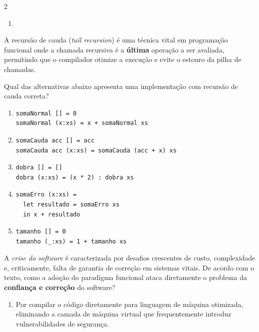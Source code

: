 \documentclass[a4paper,10pt,brazil]{article}
\begin{document}
\begin{multicols}{2}
\begin{enumerate}
  \item {}


\end{enumerate}

A recursão de cauda (\emph{tail recursion}) é uma técnica vital em programação funcional onde a chamada recursiva é a \textbf{última} operação a ser avaliada, permitindo que o compilador otimize a execução e evite o estouro da pilha de chamadas. 

Qual das alternativas abaixo apresenta uma implementação com recursão de cauda correta?

\begin{enumerate}
  \item \begin{verbatim}
somaNormal [] = 0
somaNormal (x:xs) = x + somaNormal xs
\end{verbatim}

  \item \begin{verbatim}
somaCauda acc [] = acc
somaCauda acc (x:xs) = somaCauda (acc + x) xs
\end{verbatim}

  \item \begin{verbatim}
dobra [] = []
dobra (x:xs) = (x * 2) : dobra xs
\end{verbatim}

  \item \begin{verbatim}
somaErro (x:xs) = 
  let resultado = somaErro xs 
  in x + resultado
\end{verbatim}

  \item \begin{verbatim}
tamanho [] = 0
tamanho (_:xs) = 1 + tamanho xs
\end{verbatim}


\end{enumerate}

A \emph{crise do software} é caracterizada por desafios crescentes de custo, complexidade e, criticamente, falta de garantia de correção em sistemas vitais. De acordo com o texto, como a adoção do paradigma funcional ataca diretamente o problema da \textbf{confiança e correção} do software?

\begin{enumerate}
  \item Por compilar o código diretamente para linguagem de máquina otimizada, eliminando a camada de máquina virtual que frequentemente introduz vulnerabilidades de segurança.


\end{enumerate}
\end{multicols}
\end{document}
